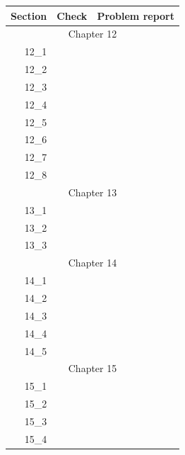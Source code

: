 \begin{tabular}{|r|r|p{8cm}|}
\hline
Section & Check & Problem report \\
\hline
\hline
\multicolumn{3}{|c|}{Chapter 12}\\
\hline
12\_1 & & \\
\hline
12\_2 & & \\
\hline
12\_3 & & \\
\hline
12\_4 & & \\
\hline
12\_5 & & \\
\hline
12\_6 & & \\
\hline
12\_7 & & \\
\hline
12\_8 & & \\
\hline
\hline
\multicolumn{3}{|c|}{Chapter 13}\\
\hline
13\_1 & & \\
\hline
13\_2 & & \\
\hline
13\_3 & & \\
\hline
\hline
\multicolumn{3}{|c|}{Chapter 14}\\
\hline
14\_1 & & \\
\hline
14\_2 & & \\
\hline
14\_3 & & \\
\hline
14\_4 & & \\
\hline
14\_5 & & \\
\hline
\hline
\multicolumn{3}{|c|}{Chapter 15}\\
\hline
15\_1 & & \\
\hline
15\_2 & & \\
\hline
15\_3 & & \\
\hline
15\_4 & & \\
\hline
\hline
\end{tabular}


